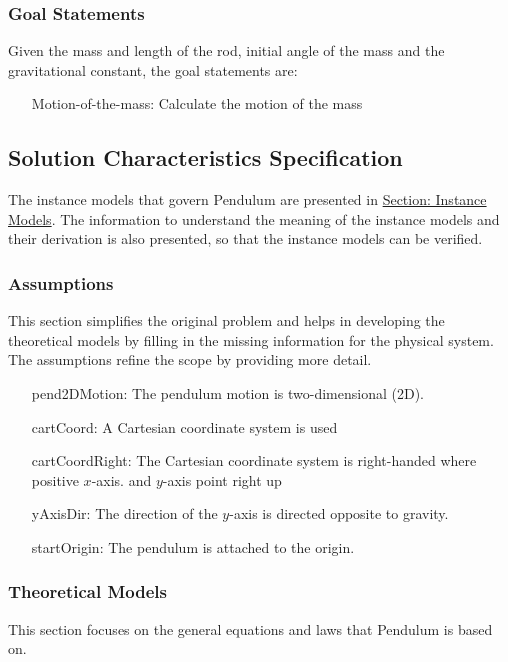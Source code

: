 \documentclass[12pt]{article}
\begin{document}
\subsubsection{Goal Statements}
\label{Sec:GoalStmt}
Given the mass and length of the rod, initial angle of the mass and the gravitational constant, the goal statements are:

\begin{itemize}
\item[Motion-of-the-mass:\phantomsection\label{motionMass}]{Calculate the motion of the mass}
\end{itemize}
\subsection{Solution Characteristics Specification}
\label{Sec:SolCharSpec}
The instance models that govern Pendulum are presented in \hyperref[Sec:IMs]{Section: Instance Models}. The information to understand the meaning of the instance models and their derivation is also presented, so that the instance models can be verified.

\subsubsection{Assumptions}
\label{Sec:Assumps}
This section simplifies the original problem and helps in developing the theoretical models by filling in the missing information for the physical system. The assumptions refine the scope by providing more detail.

\begin{itemize}
\item[pend2DMotion:\phantomsection\label{pend2DMotion}]{The pendulum motion is two-dimensional (2D).}
\item[cartCoord:\phantomsection\label{cartCoord}]{A Cartesian coordinate system is used}
\item[cartCoordRight:\phantomsection\label{cartCoordRight}]{The Cartesian coordinate system is right-handed where positive $x$-axis. and $y$-axis point right up}
\item[yAxisDir:\phantomsection\label{yAxisDir}]{The direction of the $y$-axis is directed opposite to gravity.}
\item[startOrigin:\phantomsection\label{startOrigin}]{The pendulum is attached to the origin.}
\end{itemize}
\subsubsection{Theoretical Models}
\label{Sec:TMs}
This section focuses on the general equations and laws that Pendulum is based on.
\end{document}
